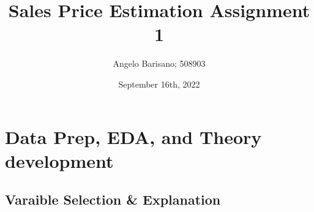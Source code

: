 \documentclass[a4paper]{article}
\begin{document}
\title{Sales Price Estimation Assignment 1}
\author{Angelo Barisano; 508903 }
\date{September 16th, 2022}
\maketitle



\pagebreak

\section{Data Prep, EDA, and Theory development}
\subsection{Varaible Selection \& Explanation}
\end{document}
